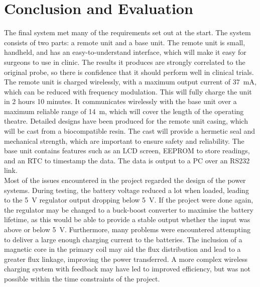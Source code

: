 \section{Conclusion and Evaluation}
The final system met many of the requirements set out at the start. The system consists of two parts: a remote unit and a base unit. The remote unit is small, handheld, and has an easy-to-understand interface, which will make it easy for surgeons to use in clinic. The results it produces are strongly correlated to the original probe, so there is confidence that it should perform well in clinical trials. The remote unit is charged wirelessly, with a maximum output current of \SI{37}{\milli\ampere}, which can be reduced with frequency modulation. This will fully charge the unit in 2 hours 10 minutes. It communicates wirelessly with the base unit over a maximum reliable range of \SI{14}{\metre}, which will cover the length of the operating theatre. Detailed designs have been produced for the remote unit casing, which will be cast from a biocompatible resin. The cast will provide a hermetic seal and mechanical strength, which are important to ensure safety and reliability. The base unit contains features such as an LCD screen, EEPROM to store readings, and an RTC to timestamp the data. The data is output to a PC over an RS232 link.\\


Most of the issues encountered in the project regarded the design of the power systems. During testing, the battery voltage reduced a lot when loaded, leading to the \SI{5}{\volt} regulator output dropping below \SI{5}{\volt}. If the project were done again, the regulator may be changed to a buck-boost converter to maximise the battery lifetime, as this would be able to provide a stable output whether the input was above or below \SI{5}{\volt}. Furthermore, many problems were encountered attempting to deliver a large enough charging current to the batteries. The inclusion of a magnetic core in the primary coil may aid the flux distribution and lead to a greater flux linkage, improving the power transferred. A more complex wireless charging system with feedback may have led to improved efficiency, but was not possible within the time constraints of the project.\\

